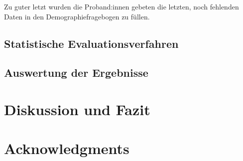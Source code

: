         Zu guter letzt wurden die Proband:innen gebeten die letzten, noch fehlenden Daten in den Demographiefragebogen zu füllen.


        \section{Statistische Evaluationsverfahren}

        \section{Auswertung der Ergebnisse}


\chapter{Diskussion und Fazit}\label{}

\chapter{Acknowledgments}\label{}


